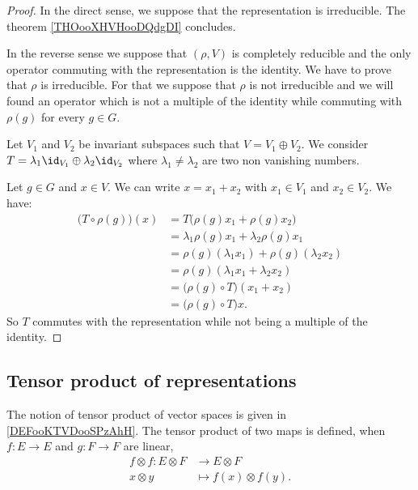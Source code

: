 \begin{proof}
	In the direct sense, we suppose that the representation is irreducible. The theorem \ref{THOooXHVHooDQdgDI} concludes.

	In the reverse sense we suppose that \( (\rho, V)\) is completely reducible and the only operator commuting with the representation is the identity. We have to prove that \( \rho\) is irreducible. For that we suppose that \( \rho\) is not irreducible and we will found an operator which is not a multiple of the identity while commuting with \( \rho(g)\) for every \( g\in G\).


	Let \( V_1\) and \( V_2\) be invariant subspaces such that \( V=V_1\oplus V_2\). We consider \( T=\lambda_1\id_{V_1}\oplus \lambda_2\id_{V_2}\) where \( \lambda_1\neq \lambda_2\) are two non vanishing numbers.

	Let \( g\in G\) and \( x\in V\). We can write \( x=x_1+x_2\) with \( x_1\in V_1\) and \( x_2\in V_2\). We have:
	\begin{subequations}
		\begin{align}
			\big( T\circ\rho(g) \big)(x) & =T\big( \rho(g)x_1+\rho(g)x_2 \big)          \\
			                             & =\lambda_1\rho(g)x_1+\lambda_2\rho(g)x_1     \\
			                             & =\rho(g)(\lambda_1x_1)+\rho(g)(\lambda_2x_2) \\
			                             & =\rho(g)(\lambda_1x_1+\lambda_2x_2)          \\
			                             & =\big( \rho(g)\circ T \big)(x_1+x_2)         \\
			                             & =\big( \rho(g)\circ T\big)x.
		\end{align}
	\end{subequations}
	So \( T\) commutes with the representation while not being a multiple of the identity.
\end{proof}

\subsection{Tensor product of representations}

The notion of tensor product of vector spaces is given in \ref{DEFooKTVDooSPzAhH}. The tensor product of two maps is defined, when \( f\colon E\to E\) and \( g\colon F\to F\) are linear,
\begin{equation}
	\begin{aligned}
		f\otimes f\colon E\otimes F & \to E\otimes F            \\
		x\otimes y                  & \mapsto f(x)\otimes f(y).
	\end{aligned}
\end{equation}


